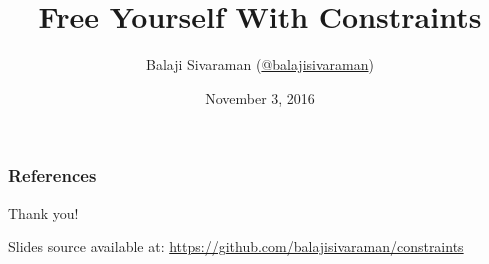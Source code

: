 \documentclass[bigger]{beamer}
\author{Balaji Sivaraman (\href{https://twitter.com/balajisivaraman}{@balajisivaraman})}
\date{November 3, 2016}
\title{Free Yourself With Constraints}
\institute{ThoughtWorks}
\begin{document}
\maketitle










\begin{frame}
\frametitle{References}

\printbibliography

\end{frame}

\begin{frame}
  \centerline{
    \huge{Thank you!}
  }
  \centerline{
    \footnotesize{Slides source available at: \href{https://github.com/balajisivaraman/constraints}{https://github.com/balajisivaraman/constraints}}
  }
\end{frame}
\end{document}
